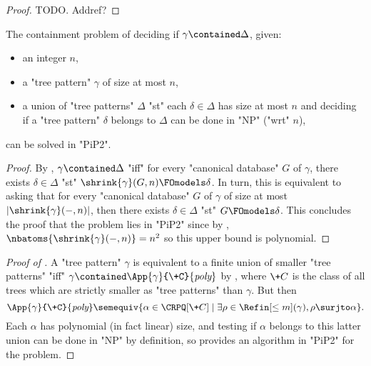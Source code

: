 \begin{proof}
  TODO. Addref?
\end{proof}

\begin{corollary}
  \AP\label{coro:containment-union-tree-patterns-better}
  The containment problem of deciding if $\gamma \contained \Delta$, given:
  \begin{itemize}
    \item an integer $n$,
    \item a "tree pattern" $\gamma$ of size at most $n$,
    \item a union of "tree patterns" $\Delta$ "st" each $\delta \in \Delta$ has size at most $n$
    and deciding if a "tree pattern" $\delta$ belongs to $\Delta$ can be done in "NP" ("wrt" $n$),
  \end{itemize} 
  can be solved in "PiP2".
\end{corollary}

\begin{proof}
  By ,
  $\gamma \contained \Delta$ "iff" for every "canonical database" $G$ of $\gamma$,
  there exists $\delta \in \Delta$ "st"
  $\shrink{\gamma}(G, n) \FOmodels \delta$.
  In turn, this is equivalent to asking that for every "canonical database" $G$ of $\gamma$
  of size at most $|\shrink{\gamma}(-, n)|$, then there exists $\delta\in \Delta$
  "st" $G \FOmodels \delta$.
  This concludes the proof that the problem lies in "PiP2" since by , $\nbatoms{\shrink{\gamma}(-, n)} = n^2$ so this
  upper bound is polynomial.
\end{proof}

\begin{proof}[Proof of ]
  A "tree pattern" $\gamma$ is equivalent to a finite union of smaller "tree patterns"
  "iff" $\gamma \contained \App{\gamma}{\+C}{\textit{poly}}$ by ,
  where $\+C$ is the class of all trees which are strictly smaller as "tree patterns"
  than $\gamma$.
  But then 
  \[
    \App{\gamma}{\+C}{\textit{poly}} \semequiv 
    \{
      \alpha \in \CRPQ[\+C] \mid \exists \rho \in \Refin[\leq m](\gamma), 
      \rho \surjto \alpha
    \}.
  \]
  Each $\alpha$ has polynomial (in fact linear) size,
  and testing if $\alpha$ belongs to this latter union can be done in "NP" by definition,
  so  provides an algorithm in "PiP2"
  for the problem.

   
\end{proof}

